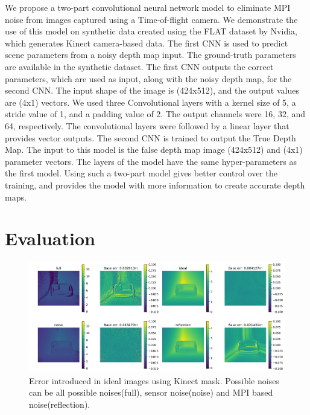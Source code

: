 \documentclass[runningheads]{llncs}
\begin{document}
We propose a two-part convolutional neural network model to eliminate MPI noise from images captured using a Time-of-flight camera. 
We demonstrate the use of this model on synthetic data created using the FLAT dataset by Nvidia, which generates Kinect camera-based data. 
\newline
\newline
The first CNN is used to predict scene parameters from a noisy depth map input. 
The ground-truth parameters are available in the synthetic dataset.
The first CNN outputs the correct parameters, which are used as input, along with the noisy depth map, for the second CNN. The input shape of the image is (424x512), and the output values are (4x1) vectors. 
We used three Convolutional layers with a kernel size of 5, a stride value of 1, and a padding value of 2. The output channels were 16, 32, and 64, respectively. 
The convolutional layers were followed by a linear layer that provides vector outputs.
\newline
The second CNN is trained to output the True Depth Map. 
The input to this model is the false depth map image (424x512) and (4x1) parameter vectors. 
The layers of the model have the same hyper-parameters as the first model.
Using such a two-part model gives better control over the training, and provides the model with more information to create accurate depth maps.



\section{Evaluation}

\begin{figure}
    \centering
    \includegraphics[scale=0.35]{img/depthmap/error.png}
    \caption{Error introduced in ideal images using Kinect mask. Possible noises can be all possible noises(full), sensor noise(noise) and MPI based noise(reflection). }
    \label{fig:result_raw}
\end{figure}
\end{document}
